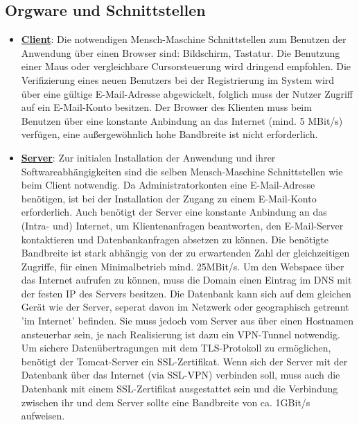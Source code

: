 \documentclass{article}
\begin{document}
\subsection{Orgware und Schnittstellen}
\begin{itemize}
\item \underline{\textbf{Client}}: \linebreak
Die notwendigen Mensch-Maschine Schnittstellen zum Benutzen der Anwendung über einen Browser sind: Bildschirm, Tastatur. Die Benutzung einer Maus oder vergleichbare Cursorsteuerung wird dringend empfohlen. Die Verifizierung eines neuen Benutzers bei der Registrierung im System wird über eine gültige E-Mail-Adresse abgewickelt, folglich muss der Nutzer Zugriff auf ein E-Mail-Konto besitzen. Der Browser des Klienten muss beim Benutzen über eine konstante Anbindung an das Internet (mind. 5 MBit/s) verfügen, eine außergewöhnlich hohe Bandbreite ist nicht erforderlich.
\item \underline{\textbf{Server}}: \linebreak
Zur initialen Installation der Anwendung und ihrer Softwareabhängigkeiten sind die selben Mensch-Maschine Schnittstellen wie beim Client notwendig. Da Administratorkonten eine E-Mail-Adresse benötigen, ist bei der Installation der Zugang zu einem E-Mail-Konto erforderlich. Auch benötigt der Server eine konstante Anbindung an das (Intra- und) Internet, um Klientenanfragen beantworten, den E-Mail-Server kontaktieren und Datenbankanfragen absetzen zu können. Die benötigte Bandbreite ist stark abhängig von der zu erwartenden Zahl der gleichzeitigen Zugriffe, für einen Minimalbetrieb mind. 25MBit/s. Um den Webspace über das Internet aufrufen zu können, muss die Domain einen Eintrag im DNS mit der festen IP des Servers besitzen. Die Datenbank kann sich auf dem gleichen Gerät wie der Server, seperat davon im Netzwerk oder geographisch getrennt 'im Internet'  befinden. Sie muss jedoch vom Server aus über einen Hostnamen ansteuerbar sein, je nach Realisierung ist dazu ein VPN-Tunnel notwendig. Um sichere Datenübertragungen mit dem TLS-Protokoll zu ermöglichen, benötigt der Tomcat-Server ein SSL-Zertifikat. Wenn sich der Server mit der Datenbank über das Internet (via SSL-VPN) verbinden soll, muss auch die Datenbank mit einem SSL-Zertifikat ausgestattet sein und die Verbindung zwischen ihr und dem Server sollte eine Bandbreite von ca. 1GBit/s aufweisen. 
\end{itemize}
\end{document}
